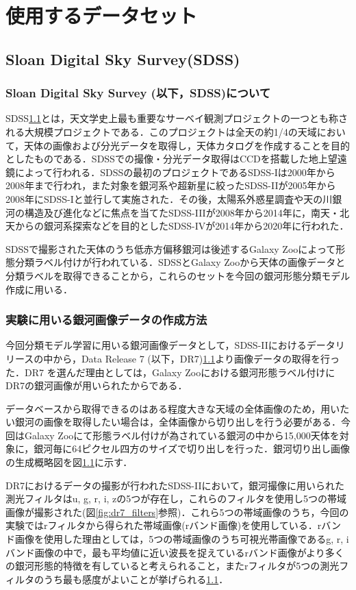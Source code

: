 \documentclass[a4j, 11pt]{jreport}
\begin{document}
\newpage
\chapter{使用するデータセット}
\section{Sloan Digital Sky Survey(SDSS)}
\subsection*{Sloan Digital Sky Survey (以下，SDSS)について}
SDSS\ref{}とは，天文学史上最も重要なサーベイ観測プロジェクトの一つとも称される大規模プロジェクトである．このプロジェクトは全天の約1/4の天域において，天体の画像および分光データを取得し，天体カタログを作成することを目的としたものである．SDSSでの撮像・分光データ取得はCCDを搭載した地上望遠鏡によって行われる．SDSSの最初のプロジェクトであるSDSS-Iは2000年から2008年まで行われ，また対象を銀河系や超新星に絞ったSDSS-IIが2005年から2008年にSDSS-Iと並行して実施された．その後，太陽系外惑星調査や天の川銀河の構造及び進化などに焦点を当てたSDSS-IIIが2008年から2014年に，南天・北天からの銀河系探索などを目的としたSDSS-IVが2014年から2020年に行われた．

SDSSで撮影された天体のうち低赤方偏移銀河は後述するGalaxy Zooによって形態分類ラベル付けが行われている．SDSSとGalaxy Zooから天体の画像データと分類ラベルを取得できることから，これらのセットを今回の銀河形態分類モデル作成に用いる．
\subsection*{実験に用いる銀河画像データの作成方法}
今回分類モデル学習に用いる銀河画像データとして，SDSS-IIにおけるデータリリースの中から，Data Release 7 (以下，DR7)\ref{}より画像データの取得を行った．DR7 を選んだ理由としては，Galaxy Zooにおける銀河形態ラベル付けにDR7の銀河画像が用いられたからである．

データベースから取得できるのはある程度大きな天域の全体画像のため，用いたい銀河の画像を取得したい場合は，全体画像から切り出しを行う必要がある．今回はGalaxy Zooにて形態ラベル付けが為されている銀河の中から15,000天体を対象に，銀河毎に64ピクセル四方のサイズで切り出しを行った．銀河切り出し画像の生成概略図を図\ref{}に示す．

DR7におけるデータの撮影が行われたSDSS-IIにおいて，銀河撮像に用いられた測光フィルタはu, g, r, i, zの5つが存在し，これらのフィルタを使用し5つの帯域画像が撮影された(図\ref{fig:dr7_filters}参照)．これら5つの帯域画像のうち，今回の実験ではrフィルタから得られた帯域画像(rバンド画像)を使用している．rバンド画像を使用した理由としては，5つの帯域画像のうち可視光帯画像であるg, r, iバンド画像の中で，最も平均値に近い波長を捉えているrバンド画像がより多くの銀河形態的特徴を有していると考えられること，またrフィルタが5つの測光フィルタのうち最も感度がよいことが挙げられる\ref{}．
\end{document}

